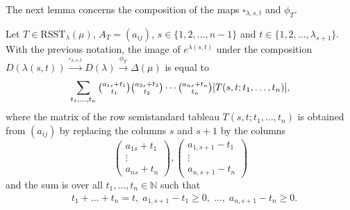 \documentclass[ALCO,Unicode]{cedram}
\newcommand{\la}{\lambda}
\numberwithin{equation}{section}
\begin{document}
The next lemma concerns the composition of the maps $\square_{\la, s, t}$ and $\phi_T$.
\begin{lemma}\label{comp2}
	Let  $T \in \mathrm{RSST}_{\la}(\mu)$, $A_T=(a_{ij})$, $s \in \{1,2,\dots,n-1\}$ and $t \in \{1,2,\dots,\la_{s+1}\}$. With the previous notation, the image of $e^{\la(s,t)}$ under the composition $D(\la(s,t)) \xrightarrow{\square_{\la, s,t}} D(\la) \xrightarrow{\phi_T} \Delta(\mu) $ is equal to \begin{equation}\label{eq11}
		\sum_{t_1,\dots,t_{n}}\tbinom{a_{1s}+t_1}{t_1}\tbinom{a_{2s}+t_2}{t_2} \cdots \tbinom{a_{ns}+t_n}{t_n}[T(s,t;t_1,\dots,t_{n})],\end{equation}
	where the matrix  of the row semistandard tableau $T(s,t;t_1,\dots,t_{n})$ is obtained from $(a_{ij})$ by replacing the columns $s$ and $s+1$ by the columns \[\begin{pmatrix}a_{1s}+t_1 \\ \vdots \\ a_{ns}+t_n \end{pmatrix}, \begin{pmatrix}a_{1,s+1}-t_1 \\ \vdots \\ a_{n,s+1}-t_n \end{pmatrix}\]
	and the sum is over all $t_1,\dots,t_{n} \in \mathbb{N}$ such that \begin{align}\label{ineq111}&t_{1}+\dots+t_{n}=t, \; a_{1,s+1}-t_1 \ge 0, \; \dots, \; a_{n,s+1}-t_{n} \ge 0.\end{align}
\end{lemma}
\end{document}
